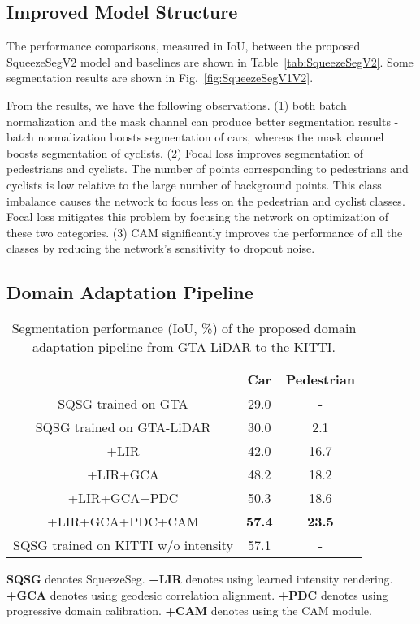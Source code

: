 \documentclass[letterpaper, 10 pt, conference]{ieeeconf}
\begin{document}
\subsection{Improved Model Structure}
\label{ssec:Results_SqueezeSegV2}
The performance comparisons, measured in IoU, between the proposed SqueezeSegV2 model and baselines  are shown in Table~\ref{tab:SqueezeSegV2}. Some segmentation results are shown in Fig.~\ref{fig:SqueezeSegV1V2}.

From the results, we have the following observations. (1) both batch normalization and the mask channel can produce better segmentation results - batch normalization boosts segmentation of cars, whereas the mask channel boosts segmentation of cyclists. (2) Focal loss improves segmentation of pedestrians and cyclists. The number of points corresponding to pedestrians and cyclists is low relative to the large number of background points. This class imbalance causes the network to focus less on the pedestrian and cyclist classes. Focal loss mitigates this problem by focusing the network on optimization of these two categories. (3) CAM significantly improves the performance of all the classes by reducing the network's sensitivity to dropout noise. 

\subsection{Domain Adaptation Pipeline}
\label{ssec:Results_SqueezeSegUDA}



\begin{table}[!t]
\begin{center}
\small
\caption{Segmentation performance (IoU, \%) of the proposed domain adaptation pipeline from GTA-LiDAR to the KITTI.}\begin{tabular}
{c | c  c }
\hline
& \multicolumn{1}{c}{Car} & \multicolumn{1}{c}{Pedestrian}\\
\hline
SQSG trained on GTA \cite{wu2017squeezeseg}  &  29.0 & -  \\
SQSG trained on GTA-LiDAR & 30.0 & 2.1 \\
+LIR   &  42.0 & 16.7  \\
+LIR+GCA &  48.2 & 18.2\\
+LIR+GCA+PDC  &  50.3 & 18.6  \\
+LIR+GCA+PDC+CAM  &  \textbf{57.4}  & \textbf{23.5}  \\
\hline
SQSG trained on KITTI w/o intensity \cite{wu2017squeezeseg} & 57.1 & - \\
\hline
\end{tabular}
\label{tab:DA_Result}
\end{center}
 \textbf{SQSG} denotes SqueezeSeg. \textbf{+LIR} denotes using learned intensity rendering. \textbf{+GCA} denotes using geodesic correlation alignment. \textbf{+PDC} denotes using progressive domain calibration. \textbf{+CAM} denotes using the CAM module.
 
 \vspace{-0.4cm}
\end{table}
\end{document}
